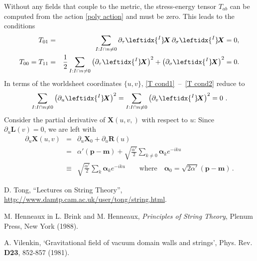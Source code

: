 \documentclass{revtex4}
\newcommand{\be}{\begin{eqnarray}}
\newcommand{\ee}{\end{eqnarray}}
\def\X{\bm{X}}
\def\L{\bm{\lambda}}
\def\a{\bm{a}}
\def\lI{\leftidx{^I} \! }
\def\L{\bm{L}}
\def\R{\bm{R}}
\def\a{\bm{\alpha}}
\begin{document}
Without any fields that couple to the metric, the stress-energy tensor $T_{ab}$ can be computed from the action \eqref{poly action} and must be zero. This leads to the conditions
\be
\label{T cond1}
T_{01} &=& \sum_{I: I \cap n \neq 0} \partial_\tau \lI \X \,  \partial_\sigma \lI \X = 0 , \\
\label{T cond2}
T_{00} = T_{11} &=& \frac{1}{2} \sum_{I: I \cap n \neq 0} \left( \partial_\tau \lI\X\right)^2 + \left(\partial_\sigma \lI\X \right)^2 = 0.
\ee
In terms of the worldsheet coordinates $\{u, v\}$, \eqref{T cond1}~\!--~\!\eqref{T cond2} reduce to 
\be
\label{T cond}
\sum_{I: I \cap n \neq 0} \left( \partial_u \lI \X \right)^2 = \sum_{I: I \cap n \neq 0} \left( \partial_v \lI \X \right)^2 = 0\ .
\ee
Consider the partial derivative of $\X(u,v,)$ with respect to $u$: Since $\partial_u \L(v) = 0$, we are left with
\be
\partial_u \X(u,v) &=& \partial_u \X_0 + \partial_u \R(u) \nonumber \\
			  &=& \alpha' ({\bm p} - {\bm m} ) + \sqrt{\frac{\alpha'}{2}}\sum_{k \neq 0} \a_k e^{-ik u} \nonumber \\
			  &\equiv& \sqrt{\frac{\alpha'}{2}} \sum_k \a_k e^{-iku} \qquad \text{where} \quad \a_0 = \sqrt{2\alpha'} ({\bm p} - {\bm m}) \, .
\ee


\begin{acknowledgments}
\end{acknowledgments}


\begin{thebibliography}{99}

 D. Tong, ``Lectures on String Theory'', \url{http://www.damtp.cam.ac.uk/user/tong/string.html}.

  M. Henneaux in L. Brink and M. Henneaux, {\it Principles of String Theory}, Plenum Press, New York (1988).

 A. Vilenkin, `Gravitational field of vacuum domain walls and strings', Phys. Rev. {\bf D23}, 852-857 (1981).

\end{thebibliography}
\end{document}
